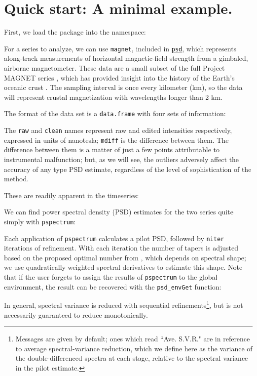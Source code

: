 \documentclass[10pt]{article}\usepackage[]{graphicx}\usepackage[]{color}
\newcommand{\Rcmd}[1]{\texttt{#1}}
\newcommand{\psd}[0]{\href{https://www.github.com/abarbour/psd/}{\color{blue}\Rcmd{psd}}}
\begin{document}
\section{Quick start: A minimal example.}
First, we load the package into the namespace:

For a series to analyze, we can use \Rcmd{magnet}, included in \psd{},
which represents along-track measurements
of horizontal magnetic-field strength from a gimbaled, airborne magnetometer.
These data are a small subset of the full Project MAGNET series \citep{coleman1992},
which has provided insight into
the history of the Earth's oceanic crust 
\citep{parker1997, obrien1999, korte2002}.
The sampling interval is
once every kilometer (km), so the data will represent
crustal magnetization with wavelengths longer than 2 km.

The format of the data set is a \Rcmd{data.frame} with four
sets of information:

The \Rcmd{raw} and \Rcmd{clean} names represent raw
and edited intensities respectively, expressed in units of nanotesla; 
\Rcmd{mdiff} is the difference between them.
The difference between them is a matter of just a few points
attributable to instrumental malfunction; but, as we will see, the
outliers adversely affect the accuracy of any type PSD estimate, regardless
of the level of sophistication of the method.

These are readily apparent in the timeseries:



We can find power spectral density (PSD)
estimates for the two series quite simply with \Rcmd{pspectrum}:

Each application of \Rcmd{pspectrum} calculates a pilot PSD, followed by 
\Rcmd{niter}
iterations of refinement.
With each iteration
the number of tapers is adjusted 
based on the proposed optimal number from \citet{rs1995}, which
depends on spectral shape; we use 
quadratically weighted spectral derivatives \citep{prieto2007}
to estimate this shape.
Note that if the user forgets to assign the results of
\Rcmd{pspectrum} to the global environment, the result can
be recovered with the \Rcmd{psd\_envGet} function:


In general, spectral variance is reduced
with sequential refinements\footnote{
  Messages are given by default; ones which read
  ``Ave. S.V.R." are in reference to 
  average spectral-variance reduction, which
  we define here as the variance of the
  double-differenced spectra at each stage, relative
  to the spectral variance in the pilot estimate.
}, but is not necessarily guaranteed to reduce monotonically.
\end{document}
